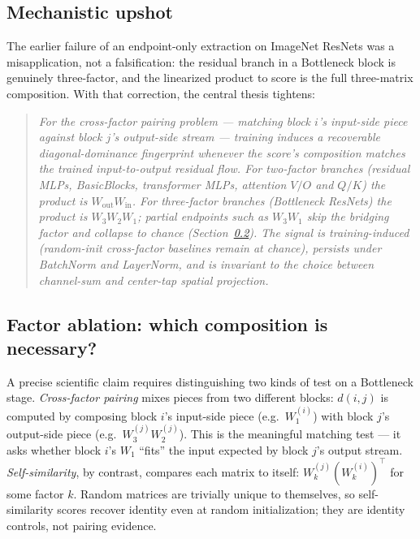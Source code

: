 \documentclass[10pt]{article}
\theoremstyle{remark}
\begin{document}
\subsection{Mechanistic upshot}

The earlier failure of an endpoint-only extraction on ImageNet ResNets
was a misapplication, not a falsification: the residual branch in a
Bottleneck block is genuinely three-factor, and the linearized product
to score is the full three-matrix composition. With that correction,
the central thesis tightens:

\begin{quote}\itshape
For the \emph{cross-factor pairing problem} --- matching block $i$'s
input-side piece against block $j$'s output-side stream --- training
induces a recoverable diagonal-dominance fingerprint whenever the
score's composition matches the trained input-to-output residual
flow. For two-factor branches (residual MLPs, BasicBlocks,
transformer MLPs, attention $V/O$ and $Q/K$) the product is
$W_{\mathrm{out}} W_{\mathrm{in}}$. For three-factor branches
(Bottleneck ResNets) the product is $W_3 W_2 W_1$; partial endpoints
such as $W_3 W_1$ skip the bridging factor and collapse to chance
(Section~\ref{sec:factor-ablation}). The signal is training-induced
(random-init cross-factor baselines remain at chance), persists under
BatchNorm and LayerNorm, and is invariant to the choice between
channel-sum and center-tap spatial projection.
\end{quote}

\subsection{Factor ablation: which composition is necessary?}\label{sec:factor-ablation}

A precise scientific claim requires distinguishing two kinds of test
on a Bottleneck stage. \emph{Cross-factor pairing} mixes pieces from
two different blocks: $d(i,j)$ is computed by composing block $i$'s
input-side piece (e.g.\ $W_1^{(i)}$) with block $j$'s output-side
piece (e.g.\ $W_3^{(j)} W_2^{(j)}$). This is the meaningful matching
test --- it asks whether block $i$'s $W_1$ ``fits'' the input
expected by block $j$'s output stream. \emph{Self-similarity}, by
contrast, compares each matrix to itself: $W_k^{(j)} (W_k^{(i)})^\top$
for some factor $k$. Random matrices are trivially unique to
themselves, so self-similarity scores recover identity even at
random initialization; they are identity controls, not pairing
evidence.
\end{document}

